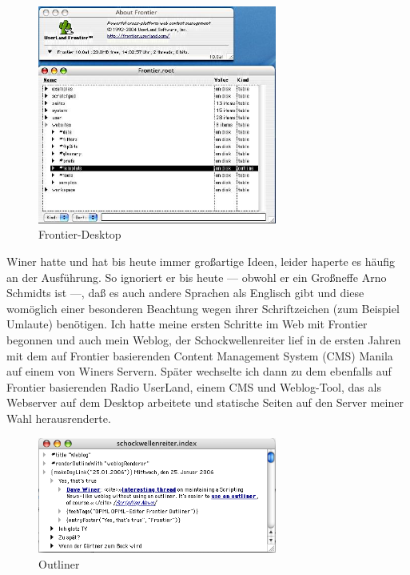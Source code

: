 \documentclass[11pt]{report}
\begin{document}
\begin{figure}[h!]
\centering
\includegraphics[width=0.7\textwidth]{./images/frontierdesktop.jpg}
\caption{\label{frontierdesktop}Frontier-Desktop}
\end{figure}

Winer hatte und hat bis heute immer großartige Ideen, leider haperte
es häufig an der Ausführung. So ignoriert er bis heute — obwohl er ein
Großneffe Arno Schmidts ist —, daß es auch andere Sprachen als
Englisch gibt und diese womöglich einer besonderen Beachtung wegen
ihrer Schriftzeichen (zum Beispiel Umlaute) benötigen. Ich hatte meine
ersten Schritte im Web mit Frontier begonnen und auch mein Weblog, der
Schockwellenreiter lief in de ersten Jahren mit dem auf Frontier
basierenden Content Management System (CMS) Manila auf einem von
Winers Servern. Später wechselte ich dann zu dem ebenfalls auf
Frontier basierenden Radio UserLand, einem CMS und Weblog-Tool, das
als Webserver auf dem Desktop arbeitete und statische Seiten auf den
Server meiner Wahl herausrenderte.

\begin{figure}[h!]
\centering
\includegraphics[width=0.7\textwidth]{./images/outliningswr.png}
\caption{\label{outliner}Outliner}
\end{figure}
\end{document}
